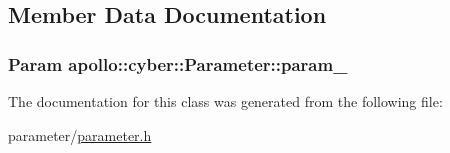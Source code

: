 \subsection{Member Data Documentation}
\hypertarget{classapollo_1_1cyber_1_1Parameter_af14040486811156fb1a4f76140623f11}{
\subsubsection[{param\-\_\-}]{\setlength{\rightskip}{0pt plus 5cm}Param apollo\-::cyber\-::\-Parameter\-::param\-\_\-\hspace{0.3cm}{\ttfamily [private]}}}\label{classapollo_1_1cyber_1_1Parameter_af14040486811156fb1a4f76140623f11}


The documentation for this class was generated from the following file\-:\begin{DoxyCompactItemize}
\item 
parameter/\hyperlink{parameter_8h}{parameter.\-h}\end{DoxyCompactItemize}
